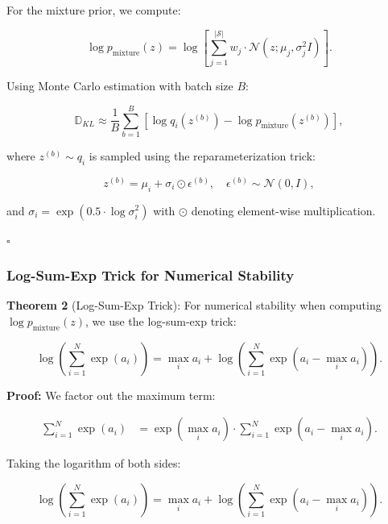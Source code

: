 For the mixture prior, we compute:

\begin{equation}
\log p_{\text{mixture}}(z) = \log \left[ \sum_{j=1}^{|\mathcal{S}|} w_j \cdot \mathcal{N}(z; \mu_j, \sigma_j^2 I) \right].
\end{equation}

Using Monte Carlo estimation with batch size $B$:

\begin{equation}
\mathbb{D}_{KL} \approx \frac{1}{B} \sum_{b=1}^{B} \left[ \log q_i(z^{(b)}) - \log p_{\text{mixture}}(z^{(b)}) \right],
\end{equation}

where $z^{(b)} \sim q_i$ is sampled using the reparameterization trick:

\begin{equation}
z^{(b)} = \mu_i + \sigma_i \odot \epsilon^{(b)}, \quad \epsilon^{(b)} \sim \mathcal{N}(0, I),
\end{equation}

and $\sigma_i = \exp(0.5 \cdot \log\sigma_i^2)$ with $\odot$ denoting element-wise multiplication.

$\square$

\subsubsection{Log-Sum-Exp Trick for Numerical Stability}

\textbf{Theorem 2} (Log-Sum-Exp Trick): For numerical stability when computing $\log p_{\text{mixture}}(z)$, we use the log-sum-exp trick:

\begin{equation}
\log\left(\sum_{i=1}^{N} \exp(a_i)\right) = \max_i a_i + \log\left(\sum_{i=1}^{N} \exp(a_i - \max_i a_i)\right).
\end{equation}

\textbf{Proof:} We factor out the maximum term:

\begin{align}
\sum_{i=1}^{N} \exp(a_i) &= \exp(\max_i a_i) \cdot \sum_{i=1}^{N} \exp(a_i - \max_i a_i).
\end{align}

Taking the logarithm of both sides:

\begin{equation}
\log\left(\sum_{i=1}^{N} \exp(a_i)\right) = \max_i a_i + \log\left(\sum_{i=1}^{N} \exp(a_i - \max_i a_i)\right).
\end{equation}

